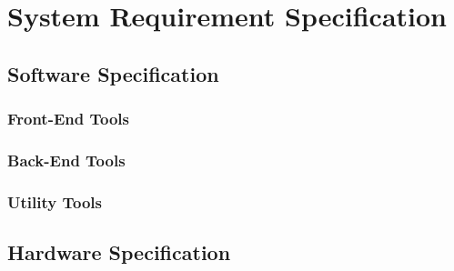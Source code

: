 
\chapter{System Requirement Specification}

\section{{\bf{Software Specification}}}


\subsection{{\bf{Front-End Tools}}}


\subsection{{\bf{Back-End Tools}}}

\subsection{{\bf{Utility Tools}}}


\section{{\bf{Hardware Specification}}}